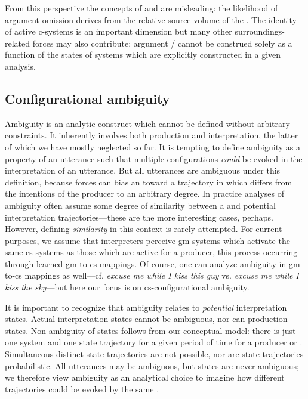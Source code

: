   From this perspective the concepts of  and  are misleading: the likelihood of argument omission derives from the relative source volume of the . The identity of active c-systems is an important dimension but many other surroundings-related forces may also contribute: argument / cannot be construed solely as a function of the states of systems which are explicitly constructed in a given analysis.

\subsection{Configurational ambiguity}

Ambiguity is an analytic construct which cannot be defined without arbitrary constraints. It inherently involves both production and interpretation, the latter of which we have mostly neglected so far. It is tempting to define ambiguity as a property of an utterance such that multiple-configurations \textit{could} be evoked in the interpretation of an utterance. But all utterances are ambiguous under this definition, because  forces can bias an  toward a trajectory in which  differs from the intentions of the producer to an arbitrary degree. In practice analyses of ambiguity often assume some degree of similarity between a  and potential interpretation trajectories—these are the more interesting cases, perhaps. However, defining \textit{similarity} in this context is rarely attempted. For current purposes, we assume that interpreters perceive gm-systems which activate the same cs-systems as those which are active for a producer, this process occurring through learned gm-to-cs mappings. Of course, one can analyze ambiguity in gm-to-cs mappings as well—cf. \textit{excuse me while I kiss this guy} vs. \textit{excuse me while I kiss the sky}—but here our focus is on cs-configurational ambiguity. 

  It is important to recognize that ambiguity relates to \textit{potential} interpretation states. Actual interpretation states cannot be ambiguous, nor can production states. Non-ambiguity of states follows from our conceptual model: there is just one system and one state trajectory for a given period of time for a producer or . Simultaneous distinct state trajectories are not possible, nor are state trajectories probabilistic. All utterances may be ambiguous, but states are never ambiguous; we therefore view ambiguity as an analytical choice to imagine how different  trajectories could be evoked by the same .

